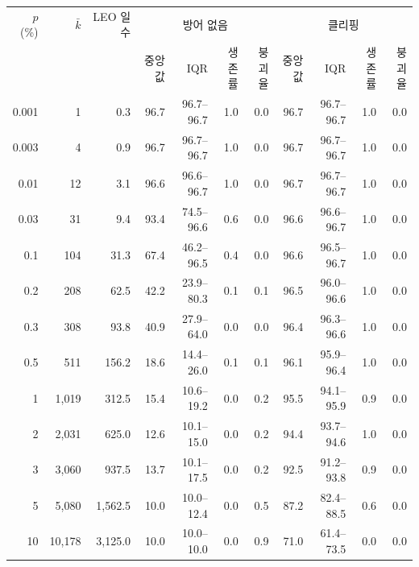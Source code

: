 \begin{tabular}{rrr|rrrr|rrrr}
\toprule
$p$ (\%) & $\bar{k}$ & LEO 일수 & \multicolumn{4}{c|}{방어 없음} & \multicolumn{4}{c}{클리핑} \\
 & & & 중앙값 & IQR & 생존률 & 붕괴율 & 중앙값 & IQR & 생존률 & 붕괴율 \\
\midrule
0.001 & 1 & 0.3 & 96.7 & 96.7--96.7 & 1.0 & 0.0 & 96.7 & 96.7--96.7 & 1.0 & 0.0 \\
0.003 & 4 & 0.9 & 96.7 & 96.7--96.7 & 1.0 & 0.0 & 96.7 & 96.7--96.7 & 1.0 & 0.0 \\
0.01 & 12 & 3.1 & 96.6 & 96.6--96.7 & 1.0 & 0.0 & 96.7 & 96.7--96.7 & 1.0 & 0.0 \\
0.03 & 31 & 9.4 & 93.4 & 74.5--96.6 & 0.6 & 0.0 & 96.6 & 96.6--96.7 & 1.0 & 0.0 \\
0.1 & 104 & 31.3 & 67.4 & 46.2--96.5 & 0.4 & 0.0 & 96.6 & 96.5--96.7 & 1.0 & 0.0 \\
0.2 & 208 & 62.5 & 42.2 & 23.9--80.3 & 0.1 & 0.1 & 96.5 & 96.0--96.6 & 1.0 & 0.0 \\
0.3 & 308 & 93.8 & 40.9 & 27.9--64.0 & 0.0 & 0.0 & 96.4 & 96.3--96.6 & 1.0 & 0.0 \\
0.5 & 511 & 156.2 & 18.6 & 14.4--26.0 & 0.1 & 0.1 & 96.1 & 95.9--96.4 & 1.0 & 0.0 \\
1 & 1,019 & 312.5 & 15.4 & 10.6--19.2 & 0.0 & 0.2 & 95.5 & 94.1--95.9 & 0.9 & 0.0 \\
2 & 2,031 & 625.0 & 12.6 & 10.1--15.0 & 0.0 & 0.2 & 94.4 & 93.7--94.6 & 1.0 & 0.0 \\
3 & 3,060 & 937.5 & 13.7 & 10.1--17.5 & 0.0 & 0.2 & 92.5 & 91.2--93.8 & 0.9 & 0.0 \\
5 & 5,080 & 1,562.5 & 10.0 & 10.0--12.4 & 0.0 & 0.5 & 87.2 & 82.4--88.5 & 0.6 & 0.0 \\
10 & 10,178 & 3,125.0 & 10.0 & 10.0--10.0 & 0.0 & 0.9 & 71.0 & 61.4--73.5 & 0.0 & 0.0 \\
\bottomrule
\end{tabular}
